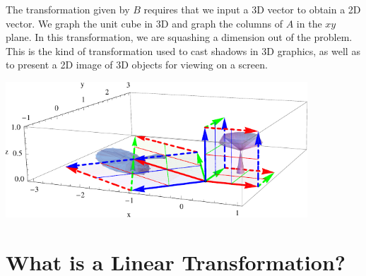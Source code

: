 \begin{example}
The transformation given by $B$ requires that we input a 3D vector to obtain a 2D vector.  We graph the unit cube in 3D and graph the columns of $A$ in the $xy$ plane. In this transformation, we are squashing a dimension out of the problem. This is the kind of transformation used to cast shadows in 3D graphics, as well as to present a 2D image of 3D objects for viewing on a screen. 
\begin{center}
\includegraphics[height=2in]{04-Linear-Transformations/support/LT3dto2d}
\end{center}


\end{example}


\section{What is a Linear Transformation?}

